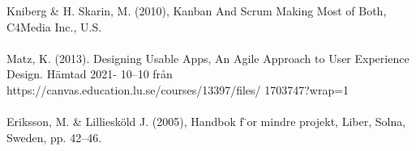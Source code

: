 \documentclass[12pt]{article}
\begin{document}
\noindent
[2] Kniberg \& H. Skarin, M. (2010), Kanban And Scrum Making Most of Both, C4Media Inc., U.S. \\\\
\noindent
[3] Matz, K. (2013). Designing Usable Apps, An Agile Approach to User Experience Design. Hämtad 2021-
10–10 från https://canvas.education.lu.se/courses/13397/files/
1703747?wrap=1 \\\\
\noindent
[4] Eriksson, M. \& Lilliesköld J. (2005), Handbok f ̈or mindre projekt, Liber, Solna, Sweden, pp. 42–46.

\end{document}
